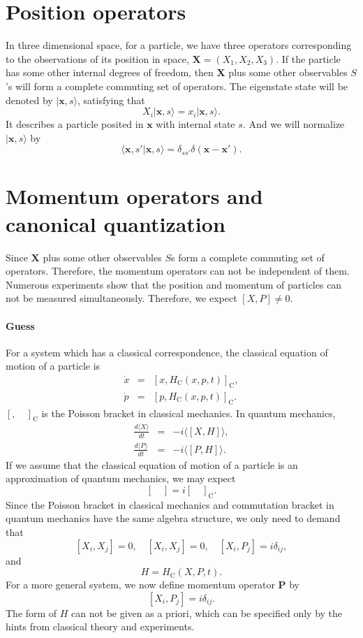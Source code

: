 \section{Position operators}
\noindent
In three dimensional space, for a particle, we have three operators corresponding to the observations of its position in space, $\bm{X} = (X_1, X_2, X_3)$. If the particle has some other internal degrees of freedom, then $\bm{X}$ plus some other observables $S$'s will form  a complete commuting set of operators. The eigenstate state will be denoted by $| \bm{x},s \rangle$, satisfying that
\[X_i | \bm{x},s \rangle = x_i | \bm{x},s \rangle  .\]
It describes a particle posited in $\bm{x}$ with internal state $s$. And we will normalize $| \bm{x},s \rangle $ by 
\[\langle \bm{x},s'| \bm{x},s \rangle = \delta_{ss'}\delta(\bm{x}-\bm{x}').\]

\section{Momentum operators and canonical quantization}
\noindent
Since $\bm{X}$ plus some other observables $S$s form a complete commuting set of operators. Therefore, the momentum operators can not be independent of them. Numerous experiments show that the position and momentum of particles can not be measured simultaneously. Therefore, we expect $[X,P] \neq 0$.
\paragraph{Guess} 
For a system which has a classical correspondence, the classical equation of motion of a particle is
\begin{eqnarray}
\dot{x} &=& [x,H_{\mathrm{C}}(x,p,t)]_{\mathrm{C}}, \nonumber \\
\dot{p} &=& [p,H_{\mathrm{C}}(x,p,t)]_{\mathrm{C}}. \nonumber
\end{eqnarray}
$[, \quad]_{\mathrm{C}}$ is the Poisson bracket in classical mechanics. In quantum mechanics,
\begin{eqnarray}
\frac{d\langle X \rangle}{dt} &=& -i \langle [X,H] \rangle, \nonumber \\
\frac{d\langle P \rangle}{dt} &=& -i \langle [P,H] \rangle. \nonumber
\end{eqnarray}
If we assume that the classical equation of motion of a particle is an approximation of quantum mechanics, we may expect
\[[ \quad] = i [ \quad]_{\mathrm{C}} .\]
Since the Poisson bracket in classical mechanics and commutation bracket in quantum mechanics have the same algebra structure, we only need to demand that
\[[X_i,X_j] = 0 , \quad [X_i,X_j] = 0 , \quad [X_i,P_j] = i \delta_{ij},\]
and
\[H = H_{\mathrm{C}}(X,P,t).\]
For a more general system, we now define momentum operator $\bm{P}$ by 
\[[X_i,P_j] = i \delta_{ij}.\]
The form of $H$ can not be given as a priori, which can be specified only by the hints from classical theory and experiments.

